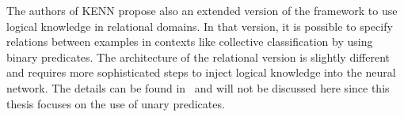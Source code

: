 The authors of KENN propose also an extended version of the framework to use logical knowledge in relational domains. In that version, it is possible to specify relations between examples in contexts like collective classification by using binary predicates. The architecture of the relational version is slightly different and requires more sophisticated steps to inject logical knowledge into the neural network. The details can be found in~\cite{daniele2021neural} and will not be discussed here since this thesis focuses on the use of unary predicates.